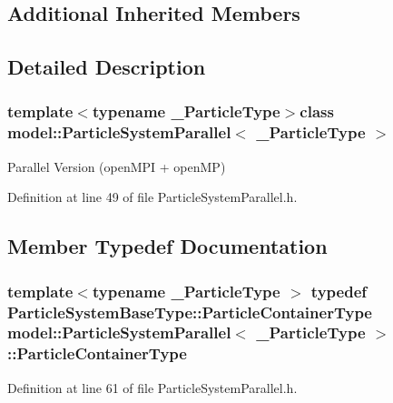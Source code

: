 \subsection*{Additional Inherited Members}


\subsection{Detailed Description}
\subsubsection*{template$<$typename \+\_\+\+Particle\+Type$>$class model\+::\+Particle\+System\+Parallel$<$ \+\_\+\+Particle\+Type $>$}

Parallel Version (open\+M\+P\+I + open\+M\+P) 

Definition at line 49 of file Particle\+System\+Parallel.\+h.



\subsection{Member Typedef Documentation}
\hypertarget{classmodel_1_1_particle_system_parallel_a9e6440f201143091c993f4729a8b512e}{}
\subsubsection[{Particle\+Container\+Type}]{\setlength{\rightskip}{0pt plus 5cm}template$<$typename \+\_\+\+Particle\+Type $>$ typedef {\bf Particle\+System\+Base\+Type\+::\+Particle\+Container\+Type} {\bf model\+::\+Particle\+System\+Parallel}$<$ \+\_\+\+Particle\+Type $>$\+::{\bf Particle\+Container\+Type}}\label{classmodel_1_1_particle_system_parallel_a9e6440f201143091c993f4729a8b512e}


Definition at line 61 of file Particle\+System\+Parallel.\+h.

\hypertarget{classmodel_1_1_particle_system_parallel_a90da37866f5909badb80f473271e8a77}{}
